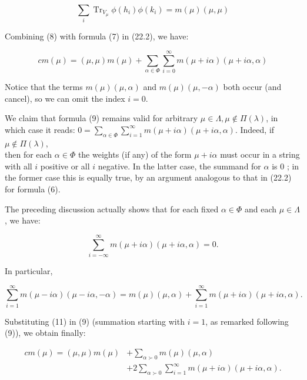 \documentclass[10pt]{article}
\begin{document}
\begin{equation*}
\sum_{i} \operatorname{Tr}_{V_{\mu}} \phi\left(h_{i}\right) \phi\left(k_{i}\right)=m(\mu)(\mu, \mu) \tag{8}
\end{equation*}


Combining (8) with formula (7) in (22.2), we have:


\begin{equation*}
c m(\mu)=(\mu, \mu) m(\mu)+\sum_{\alpha \in \Phi} \sum_{i=0}^{\infty} m(\mu+i \alpha)(\mu+i \alpha, \alpha) \tag{9}
\end{equation*}


Notice that the terms $m(\mu)(\mu, \alpha)$ and $m(\mu)(\mu,-\alpha)$ both occur (and cancel), so we can omit the index $i=0$.

We claim that formula (9) remains valid for arbitrary $\mu \in \Lambda, \mu \notin \Pi(\lambda)$, in which case it reads: $0=\sum_{\alpha \in \Phi} \sum_{i=1}^{\infty} m(\mu+i \alpha)(\mu+i \alpha, \alpha)$. Indeed, if $\mu \notin \Pi(\lambda)$,\\
then for each $\alpha \in \Phi$ the weights (if any) of the form $\mu+i \alpha$ must occur in a string with all $i$ positive or all $i$ negative. In the latter case, the summand for $\alpha$ is 0 ; in the former case this is equally true, by an argument analogous to that in (22.2) for formula (6).

The preceding discussion actually shows that for each fixed $\alpha \in \Phi$ and each $\mu \in \Lambda$, we have:


\begin{equation*}
\sum_{i=-\infty}^{\infty} m(\mu+i \alpha)(\mu+i \alpha, \alpha)=0 . \tag{10}
\end{equation*}


In particular,


\begin{equation*}
\sum_{i=1}^{\infty} m(\mu-i \alpha)(\mu-i \alpha,-\alpha)=m(\mu)(\mu, \alpha)+\sum_{i=1}^{\infty} m(\mu+i \alpha)(\mu+i \alpha, \alpha) . \tag{11}
\end{equation*}


Substituting (11) in (9) (summation starting with $i=1$, as remarked following (9)), we obtain finally:


\begin{align*}
c m(\mu)=(\mu, \mu) m(\mu) & +\sum_{\alpha \succ 0} m(\mu)(\mu, \alpha)  \tag{12}\\
& +2 \sum_{\alpha \succ 0} \sum_{i=1}^{\infty} m(\mu+i \alpha)(\mu+i \alpha, \alpha) .
\end{align*}
\end{document}
